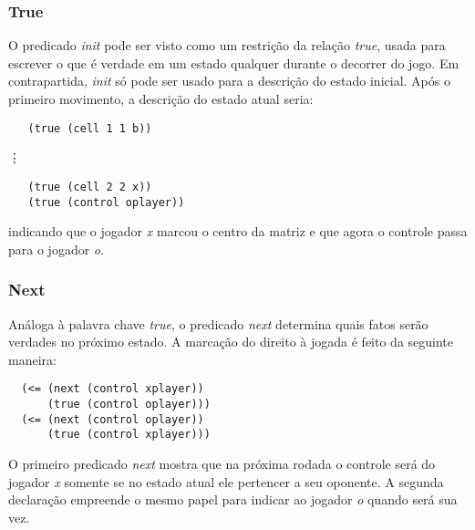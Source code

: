 \subsubsection*{True}
O predicado \textit{init} pode ser visto como um restrição da relação \textit{true}, usada para escrever o que é verdade em um estado qualquer durante o decorrer do jogo. Em contrapartida, \textit{init} só pode ser usado para a descrição do estado inicial. Após o primeiro movimento, a descrição do estado atual seria:
\begin{verbatim}                                                                                         
   (true (cell 1 1 b))
\end{verbatim}
	\hspace{1.5cm} {\LARGE{ \vdots }}
\begin{verbatim}	
   (true (cell 2 2 x))                                                                                    
   (true (control oplayer))                                                                               
\end{verbatim}
indicando que o jogador \textit{x} marcou o centro da matriz e que agora o controle passa para o jogador \textit{o}.

\subsubsection*{Next}
Análoga à palavra chave \textit{true}, o predicado \textit{next} determina quais fatos serão verdades no próximo estado. A marcação do direito à jogada é feito da seguinte maneira:
\begin{verbatim}                                                                                         
  (<= (next (control xplayer))                                                                           
      (true (control oplayer)))                                                                          
  (<= (next (control oplayer))                                                                           
      (true (control xplayer)))                                                                          
\end{verbatim}
O primeiro predicado \textit{next} mostra que na próxima rodada o controle será do jogador \textit{x} somente se no estado atual ele pertencer a seu oponente. A segunda declaração empreende o mesmo papel para indicar ao jogador \textit{o} quando será sua vez.

